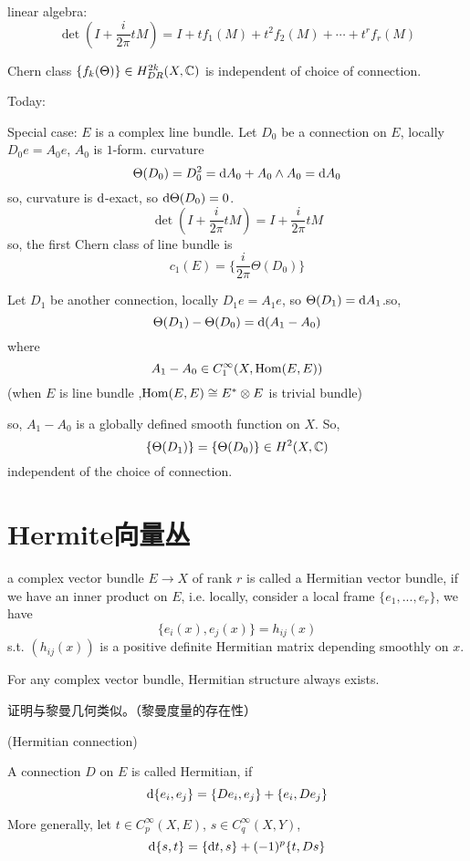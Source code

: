linear algebra:
$$\det(I+\frac{i}{2\pi}tM)=I+tf_1(M)+t^2f_2(M)+\cdots+t^rf_r(M)$$

Chern class $\{f_k(\Theta)\}\in H^{2k}_{DR}(X,\mathbb{C})$ is independent of choice of connection.

Today:

Special case: $E$ is a complex line bundle.
Let $D_0$ be a connection on $E$, locally $D_0e=A_0e$, $A_0$ is $1$-form.
curvature
$$\Theta(D_0)=D_0^2=\mathrm{d} A_0+A_0\wedge A_0=\mathrm{d} A_0$$
so, curvature is $\mathrm{d}$-exact, so $\mathrm{d}\Theta(D_0)=0$.
$$\det(I+\frac{i}{2\pi}tM)=I+\frac{i}{2\pi}tM$$
so, the first Chern class of line bundle is
$$c_1(E)=\{\frac{i}{2\pi}\Theta(D_0)\}$$

Let $D_1$ be another connection, locally $D_1e=A_1e$, so
$\Theta(D_1)=\mathrm{d} A_1$.so,
$$\Theta(D_1)-\Theta(D_0)=\mathrm{d}(A_1-A_0)$$
where
$$A_1-A_0\in C_1^\infty(X,\operatorname{Hom}(E,E))$$
(when $E$ is line bundle ,$\operatorname{Hom}(E,E)\cong E^*\otimes E$ is trivial bundle)

so, $A_1-A_0$ is a globally defined smooth function on $X$. So,
$$\{\Theta(D_1)\}=\{\Theta(D_0)\}\in H^2(X,\mathbb{C})$$
independent of the choice of connection.

\section{Hermite向量丛}

\begin{definition}
a complex vector bundle $E\to X$ of rank $r$ is called a Hermitian vector bundle, if
we have an inner product on $E$, i.e. locally, consider a local frame
$\{e_1,...,e_r\}$, we have
$$\{e_i(x),e_j(x)\}=h_{ij}(x)$$
s.t. $(h_{ij}(x))$ is a positive definite Hermitian matrix depending smoothly on $x$.
\end{definition}

\begin{rem}
For any complex vector bundle, Hermitian structure always exists.
\end{rem}

证明与黎曼几何类似。（黎曼度量的存在性）

\begin{definition}(Hermitian connection)%

A connection $D$ on $E$ is called Hermitian, if
$$\mathrm{d}\{e_i,e_j\}=\{De_i,e_j\}+\{e_i,De_j\}$$
\end{definition}

More generally, let $t\in C_p^{\infty}(X,E)$, $s\in C_q^\infty(X,Y)$,
$$\mathrm{d}\{s,t\}=\{\mathrm{d} t,s\}+(-1)^p\{t,Ds\}$$

